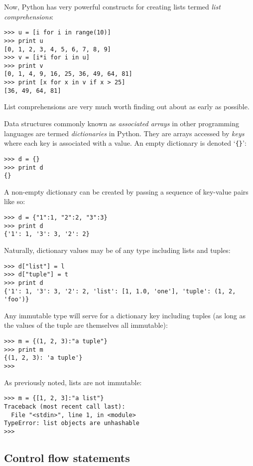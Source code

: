Now, Python has very powerful constructs for creating lists termed
\emph{list comprehensions}:
\begin{verbatim}
>>> u = [i for i in range(10)]
>>> print u
[0, 1, 2, 3, 4, 5, 6, 7, 8, 9]
>>> v = [i*i for i in u]
>>> print v
[0, 1, 4, 9, 16, 25, 36, 49, 64, 81]
>>> print [x for x in v if x > 25]
[36, 49, 64, 81]
\end{verbatim}
List comprehensions are very much worth finding out about as early as
possible.

Data structures commonly known as \emph{associated arrays} in other
programming languages are termed \emph{dictionaries} in Python. They
are arrays accessed by \emph{keys} where each key is associated with a
value. An empty dictionary is denoted `\verb|{}|':
\begin{verbatim}
>>> d = {}
>>> print d
{}
\end{verbatim}
A non-empty dictionary can be created by passing a sequence of
key-value pairs like so:
\begin{verbatim}
>>> d = {"1":1, "2":2, "3":3}
>>> print d
{'1': 1, '3': 3, '2': 2}
\end{verbatim}
Naturally, dictionary values may be of any type including lists and
tuples:
\begin{verbatim}
>>> d["list"] = l
>>> d["tuple"] = t
>>> print d
{'1': 1, '3': 3, '2': 2, 'list': [1, 1.0, 'one'], 'tuple': (1, 2, 'foo')}
\end{verbatim}
Any immutable type will serve for a dictionary key including tuples
(as long as the values of the tuple are themselves all immutable):
\begin{verbatim}
>>> m = {(1, 2, 3):"a tuple"}
>>> print m
{(1, 2, 3): 'a tuple'}
>>> 
\end{verbatim}
As previously noted, lists are not immutable:
\begin{verbatim}
>>> m = {[1, 2, 3]:"a list"}
Traceback (most recent call last):
  File "<stdin>", line 1, in <module>
TypeError: list objects are unhashable
>>> 
\end{verbatim}

\subsection{Control flow statements}

